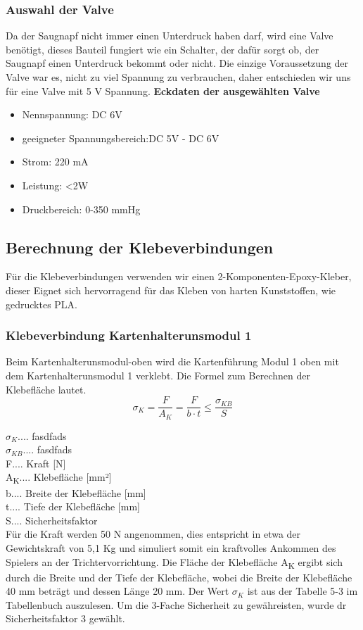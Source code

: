 \subsubsection{Auswahl der Valve}
Da der Saugnapf nicht immer einen Unterdruck haben darf, wird eine Valve benötigt, dieses Bauteil fungiert wie ein
Schalter, der dafür sorgt ob, der Saugnapf einen Unterdruck bekommt oder nicht. Die einzige Voraussetzung  der Valve war es, nicht zu viel Spannung zu verbrauchen, daher entschieden
wir uns für eine Valve mit 5 V Spannung.
\textbf{Eckdaten der ausgewählten Valve}
\begin{itemize}
    \item Nennspannung: DC 6V
    \item geeigneter Spannungsbereich:DC 5V - DC 6V
    \item Strom: 220 mA
    \item Leistung: <2W
    \item Druckbereich: 0-350 mmHg
\end{itemize}

\subsection{Berechnung der Klebeverbindungen}
Für die Klebeverbindungen verwenden wir einen 2-Komponenten-Epoxy-Kleber, dieser Eignet sich hervorragend für das
Kleben von harten Kunststoffen, wie gedrucktes PLA.

\subsubsection{Klebeverbindung Kartenhalterunsmodul 1}
Beim Kartenhalterunsmodul-oben wird die Kartenführung Modul 1 oben mit dem Kartenhalterunsmodul 1 verklebt.
Die Formel zum Berechnen der Klebefläche lautet.
\[\sigma _{K} = \frac{F}{A_{K}} = \frac{F}{b\cdot t}\leq \frac{\sigma _{KB}}{S}\]

$\sigma_{K}$.... fasdfads \\
$\sigma_{KB}$.... fasdfads\\
F.... Kraft [N]\\
A\textsubscript{K}.... Klebefläche [mm²]\\
b.... Breite der Klebefläche [mm]\\
t.... Tiefe der Klebefläche [mm]\\
S.... Sicherheitsfaktor\\

Für die Kraft werden 50 N angenommen, dies entspricht in etwa der Gewichtskraft von 5,1 Kg
und simuliert somit ein kraftvolles Ankommen des Spielers an der Trichtervorrichtung.
Die Fläche der Klebefläche A\textsubscript{K} ergibt sich durch die Breite und der Tiefe der Klebefläche, wobei
die Breite der Klebefläche  40 mm beträgt und dessen Länge 20 mm.
Der Wert $\sigma_{K}$ ist aus der Tabelle 5-3 im Tabellenbuch auszulesen.
Um die 3-Fache Sicherheit zu gewähreisten, wurde dr Sicherheitsfaktor 3 gewählt.


